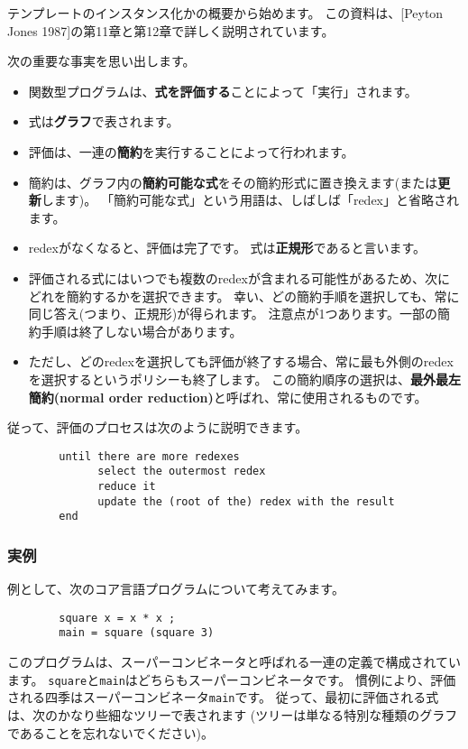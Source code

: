 \documentclass{jarticle}
\begin{document}
テンプレートのインスタンス化かの概要から始めます。
この資料は、[Peyton Jones 1987]の第11章と第12章で詳しく説明されています。

次の重要な事実を思い出します。

\begin{itemize}
	\item 関数型プログラムは、\textbf{式を評価する}ことによって「実行」されます。
	\item 式は\textbf{グラフ}で表されます。
	\item 評価は、一連の\textbf{簡約}を実行することによって行われます。
	\item 簡約は、グラフ内の\textbf{簡約可能な式}をその簡約形式に置き換えます(または\textbf{更新}します)。
	      「簡約可能な式」という用語は、しばしば「redex」と省略されます。
	\item redexがなくなると、評価は完了です。
	      式は\textbf{正規形}であると言います。
	\item 評価される式にはいつでも複数のredexが含まれる可能性があるため、次にどれを簡約するかを選択できます。
	      幸い、どの簡約手順を選択しても、常に同じ答え(つまり、正規形)が得られます。
	      注意点が1つあります。一部の簡約手順は終了しない場合があります。
	\item ただし、どのredexを選択しても評価が終了する場合、常に最も外側のredexを選択するというポリシーも終了します。
	      この簡約順序の選択は、\textbf{最外最左簡約(normal order reduction)}と呼ばれ、常に使用されるものです。
\end{itemize}

従って、評価のプロセスは次のように説明できます。

\begin{verbatim}
        until there are more redexes
              select the outermost redex
              reduce it
              update the (root of the) redex with the result
        end
\end{verbatim}

\subsubsection{実例}

例として、次のコア言語プログラムについて考えてみます。

\begin{verbatim}
        square x = x * x ;
        main = square (square 3)
\end{verbatim}

このプログラムは、スーパーコンビネータと呼ばれる一連の定義で構成されています。
\texttt{square}と\texttt{main}はどちらもスーパーコンビネータです。
慣例により、評価される四季はスーパーコンビネータ\texttt{main}です。
従って、最初に評価される式は、次のかなり些細なツリーで表されます
(ツリーは単なる特別な種類のグラフであることを忘れないでください)。
\end{document}
